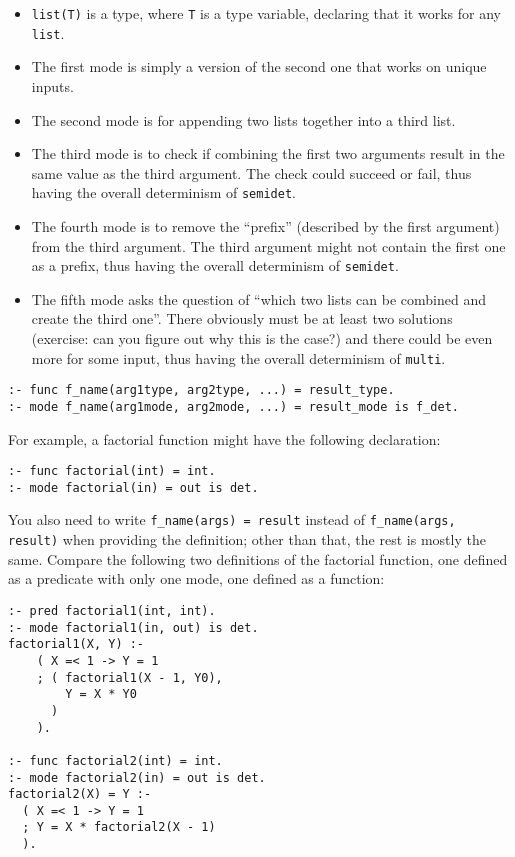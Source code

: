\begin{itemize}
\item \texttt{list(T)} is a type, where \texttt{T} is a type variable, declaring that it works for any \texttt{list}.
\item The first mode is simply a version of the second one that works on unique inputs.
\item The second mode is for appending two lists together into a third list.
\item The third mode is to check if combining the first two arguments result in the same value as the third argument. The check could succeed or fail, thus having the overall determinism of \texttt{semidet}.
\item The fourth mode is to remove the ``prefix'' (described by the first argument) from the third argument. The third argument might not contain the first one as a prefix, thus having the overall determinism of \texttt{semidet}.
  \item The fifth mode asks the question of ``which two lists can be combined and create the third one''. There obviously must be at least two solutions (exercise: can you figure out why this is the case?) and there could be even more for some input, thus having the overall determinism of \texttt{multi}.
  \end{itemize}


\begin{lstlisting}[language=Mercury]
:- func f_name(arg1type, arg2type, ...) = result_type.
:- mode f_name(arg1mode, arg2mode, ...) = result_mode is f_det.
\end{lstlisting}

  For example, a factorial function might have the following declaration:

\begin{lstlisting}[language=Mercury]
:- func factorial(int) = int.
:- mode factorial(in) = out is det.
\end{lstlisting}

  You also need to write \texttt{f\_name(args) = result} instead of \texttt{f\_name(args, result)} when providing the definition; other than that, the rest is mostly the same. Compare the following two definitions of the factorial function, one defined as a predicate with only one mode, one defined as a function:

\begin{lstlisting}[language=Mercury]
:- pred factorial1(int, int).
:- mode factorial1(in, out) is det.
factorial1(X, Y) :-
	( X =< 1 -> Y = 1
	; ( factorial1(X - 1, Y0),
		Y = X * Y0
	  )
	).

:- func factorial2(int) = int.
:- mode factorial2(in) = out is det.
factorial2(X) = Y :-
  ( X =< 1 -> Y = 1
  ; Y = X * factorial2(X - 1)
  ).
\end{lstlisting}

